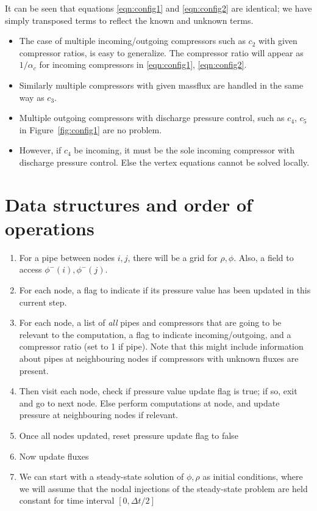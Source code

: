 \documentclass{amsart}
\begin{document}
It can be seen that equations \eqref{eqn:config1} and \eqref{eqn:config2} 
are identical; we have simply transposed terms to reflect the known and unknown terms.

\begin{itemize}
\item The case of multiple incoming/outgoing compressors such as $c_2$ with given compressor ratios, is easy to generalize. The compressor ratio will appear as $1/\alpha_c$ for incoming compressors in \eqref{eqn:config1}, \eqref{eqn:config2}. 
\item Similarly multiple compressors with given massflux are handled in the same way as  $c_3$.
\item Multiple outgoing compressors with discharge pressure control, such as $c_4$, $c_5$ in Figure~\ref{fig:config1} are no problem.
\item However, if $c_4$ be incoming, it must be the sole incoming compressor with discharge pressure control. Else the vertex equations cannot be solved locally.
\end{itemize}

\section{Data structures and order of operations}
\begin{enumerate}
\item For a pipe between nodes $i, j$, there will be a grid for $\rho, \phi$. Also, a field to access $\phi^-(i), \phi^-(j)$.
\item For each node, a flag to indicate if its pressure value has been updated in this current step.
\item For each node, a list of \emph{all} pipes and compressors that are going to be relevant to the computation, a flag to indicate incoming/outgoing, and a compressor ratio (set to 1 if pipe). Note that this might include information about pipes at neighbouring nodes if compressors with unknown fluxes are present.
\item Then visit each node, check if pressure value update flag is true; if so, exit and go to next node. Else perform computations at node, and update pressure at neighbouring nodes if relevant.
\item Once all nodes updated, reset pressure update flag to false
\item Now update fluxes
\item We can start with a steady-state solution of $\phi, \rho$ as initial conditions, where we will assume that the nodal injections of the steady-state problem are held constant for time interval $[0, \Delta t/2]$
\end{enumerate}
\end{document}
